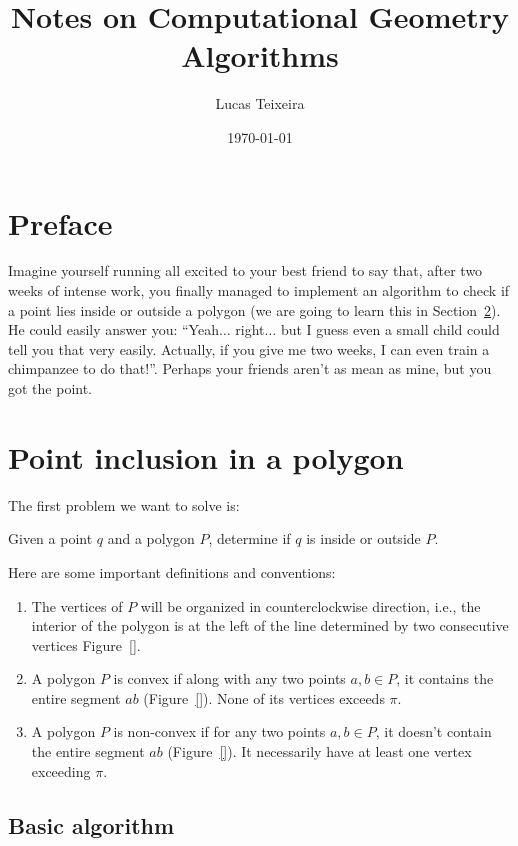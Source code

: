 \documentclass[twoside,12pt, a4paper]{memoir}
\title{Notes on Computational Geometry Algorithms}
\author{Lucas Teixeira}
\date{\today}
\begin{document}
\setcounter{secnumdepth}{3}
\maketitle
\tableofcontents

\chapter{Preface}\label{sec:intro}

Imagine yourself running all excited to your best friend to say that, after two weeks of intense work, you finally managed to implement an algorithm to check if a point lies inside or outside a polygon (we are going to learn this in Section~\ref{sec:point}). He could easily answer you: ``Yeah$\ldots$ right$\ldots$ but I guess even a small child could tell you that very easily. Actually, if you give me two weeks, I can even train a chimpanzee to do that!''. Perhaps your friends aren't as mean as mine, but you got the point.

\chapter{Point inclusion in a polygon}\label{sec:point}

The first problem we want to solve is:

Given a point $q$ and a polygon $P$, determine if $q$ is inside or outside $P$.

Here are some important definitions and conventions:

\begin{enumerate}
  \item The vertices of $P$ will be organized in counterclockwise direction, i.e., the interior of the polygon is at the left of the line determined by two consecutive vertices Figure~\ref{}.
  \item A polygon $P$ is convex if along with any two points $a, b \in P$, it contains the entire segment $ab$ (Figure~\ref{}). None of its vertices exceeds $\pi$.
  \item A polygon $P$ is non-convex if for any two points $a, b \in P$, it doesn't contain the entire segment $ab$ (Figure~\ref{}). It necessarily have at least one vertex exceeding $\pi$.
\end{enumerate}

\section{Basic algorithm}\label{subsec:point-basic}
\end{document}
